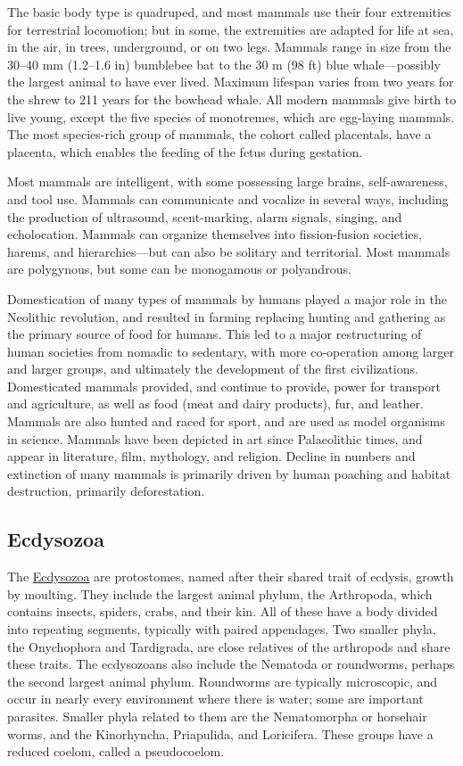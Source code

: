 The basic body type is quadruped, and most mammals use their four extremities for terrestrial locomotion; but in some, the extremities are adapted for life at sea, in the air, in trees, underground, or on two legs. Mammals range in size from the 30--40 mm (1.2--1.6 in) bumblebee bat to the 30 m (98 ft) blue whale---possibly the largest animal to have ever lived. Maximum lifespan varies from two years for the shrew to 211 years for the bowhead whale. All modern mammals give birth to live young, except the five species of monotremes, which are egg-laying mammals. The most species-rich group of mammals, the cohort called placentals, have a placenta, which enables the feeding of the fetus during gestation.

Most mammals are intelligent, with some possessing large brains, self-awareness, and tool use. Mammals can communicate and vocalize in several ways, including the production of ultrasound, scent-marking, alarm signals, singing, and echolocation. Mammals can organize themselves into fission-fusion societies, harems, and hierarchies---but can also be solitary and territorial. Most mammals are polygynous, but some can be monogamous or polyandrous.

Domestication of many types of mammals by humans played a major role in the Neolithic revolution, and resulted in farming replacing hunting and gathering as the primary source of food for humans. This led to a major restructuring of human societies from nomadic to sedentary, with more co-operation among larger and larger groups, and ultimately the development of the first civilizations. Domesticated mammals provided, and continue to provide, power for transport and agriculture, as well as food (meat and dairy products), fur, and leather. Mammals are also hunted and raced for sport, and are used as model organisms in science. Mammals have been depicted in art since Palaeolithic times, and appear in literature, film, mythology, and religion. Decline in numbers and extinction of many mammals is primarily driven by human poaching and habitat destruction, primarily deforestation.

\hypertarget{ecdysozoa}{%
\subsection{Ecdysozoa}\label{ecdysozoa}}

The \href{}{Ecdysozoa} are protostomes, named after their shared trait of ecdysis, growth by moulting. They include the largest animal phylum, the Arthropoda, which contains insects, spiders, crabs, and their kin. All of these have a body divided into repeating segments, typically with paired appendages. Two smaller phyla, the Onychophora and Tardigrada, are close relatives of the arthropods and share these traits. The ecdysozoans also include the Nematoda or roundworms, perhaps the second largest animal phylum. Roundworms are typically microscopic, and occur in nearly every environment where there is water; some are important parasites. Smaller phyla related to them are the Nematomorpha or horsehair worms, and the Kinorhyncha, Priapulida, and Loricifera. These groups have a reduced coelom, called a pseudocoelom.

